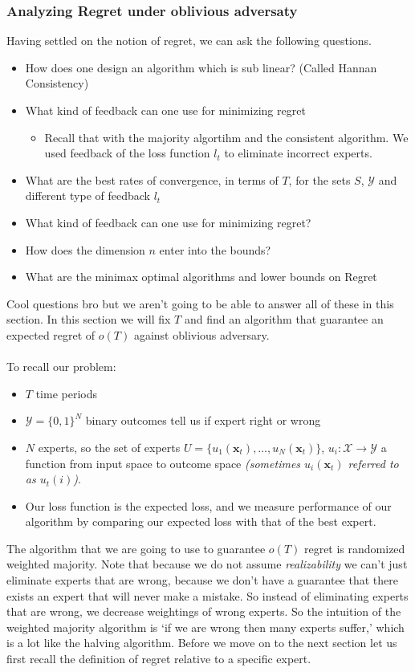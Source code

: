 \documentclass[11pt]{article}
\theoremstyle{quest}
\begin{document}
\subsubsection{Analyzing Regret under oblivious adversaty}
Having settled on the notion of regret, we can ask the following questions.
\begin{itemize}
	\item How does one design an algorithm which is sub linear? (Called Hannan Consistency)
	\item What kind of feedback can one use for minimizing regret
	\begin{itemize}
		\item Recall that with the majority algortihm and the consistent algorithm. We used feedback of the loss function $l_t$  to eliminate incorrect experts. 
	\end{itemize}
	\item What are the best rates of convergence, in terms of $T$, for the sets $S$, $\mathcal{Y}$ and different type of feedback $l_t$
	\item What kind of feedback can one use for minimizing regret? 
	\item How does the dimension $n$ enter into the bounds?
	\item What are the minimax optimal algorithms and lower bounds on Regret
\end{itemize}
Cool questions bro but we aren't going to be able to answer all of these in this section. In this section we will fix $T$ and find an algorithm that guarantee an expected regret of $o(T)$ against oblivious adversary.\\ \\ 
To recall our problem: 
\begin{itemize}
	\item $T$ time periods
	\item $\mathcal{Y}= \{0,1\}^N$ binary outcomes tell us if expert right or wrong
	\item $N$ experts, so the set of experts $U=\{u_1(\mathbf{x}_t),\dots,u_N(\mathbf{x}_t) \}$, $u_i:\mathcal{X}\rightarrow\mathcal{Y}$ a function from input space to outcome space \textit{(sometimes $u_i(\mathbf{x}_t)$ referred to as $u_t(i)$)}.
	\item Our loss function is the expected loss, and we measure performance of our algorithm by comparing our expected loss with that of the best expert.
\end{itemize}
The algorithm that we are going to use to guarantee $o(T)$ regret is randomized weighted majority. Note that because we do not assume \textit{realizability} we can't just eliminate experts that are wrong, because we don't have a guarantee that there exists an expert that will never make a mistake.  So instead of eliminating experts that are wrong, we decrease weightings of wrong experts. So the intuition of the weighted majority algorithm is `if we are wrong then many experts suffer,' which is a lot like the halving algorithm. Before we move on to the next section let us first recall the definition of regret relative to a specific expert. 
\end{document}
